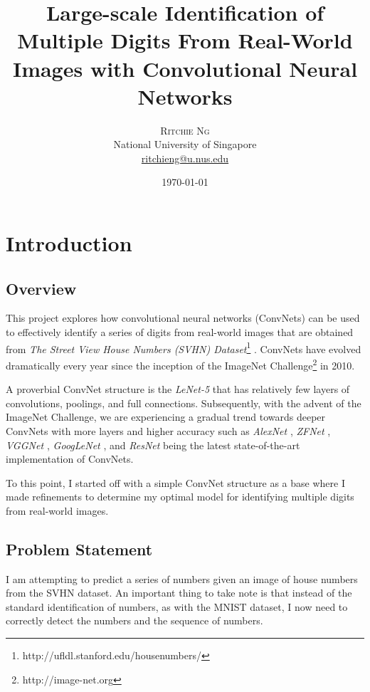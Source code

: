 \documentclass[twoside, column]{article}
\title{Large-scale Identification of Multiple Digits From Real-World Images with Convolutional Neural Networks}
\author{%
\textsc{Ritchie Ng}\\ 
\normalsize National University of Singapore\\ 
\normalsize \href{mailto:ritchieng@u.nus.edu}{ritchieng@u.nus.edu} 
}
\date{\today} %
\begin{document}
\maketitle


\section{Introduction}


\subsection{Overview}
This project explores how convolutional neural networks (ConvNets) can be used to effectively identify a series of digits from real-world images that are obtained from \textit{The Street View House Numbers (SVHN) Dataset}\footnote{http://ufldl.stanford.edu/housenumbers/} \cite{Netzer:2011aa}.  ConvNets have evolved dramatically every year since the inception of the ImageNet Challenge\footnote{http://image-net.org} in 2010. 

A proverbial ConvNet structure is the \textit{LeNet-5} that has relatively few layers of convolutions, poolings, and full connections. Subsequently, with the advent of the ImageNet Challenge, we are experiencing a gradual trend towards deeper ConvNets with more layers and higher accuracy such as \textit{AlexNet} \cite{NIPS2012_4824}, \textit{ZFNet} \cite{Zeiler:2013aa}, \textit{VGGNet \cite{Simonyan:2014aa}}, \textit{GoogLeNet} \cite{Szegedy:2014aa}, and \textit{ResNet} \cite{He:2015aa} being the latest state-of-the-art implementation of ConvNets.  

To this point, I started off with a simple ConvNet structure as a base where I made refinements to determine my optimal model for identifying multiple digits from real-world images.


\subsection{Problem Statement}
I am attempting to predict a series of numbers given an image of house numbers from the SVHN dataset. An important thing to take note is that instead of the standard identification of numbers, as with the MNIST dataset, I now need to correctly detect the numbers and the sequence of numbers. 
\end{document}
